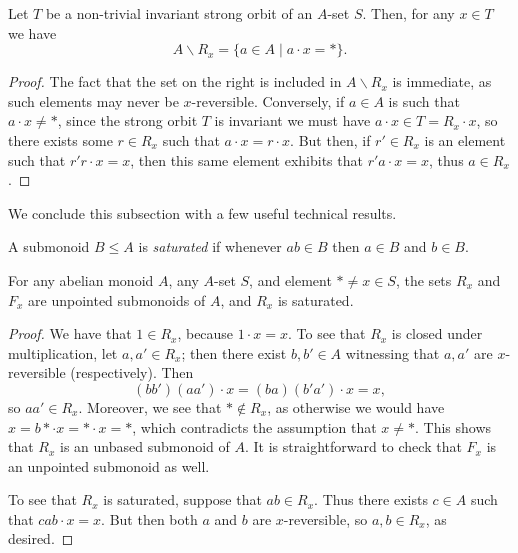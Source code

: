 \documentclass[11pt]{amsart}
\begin{document}
\begin{lemma}\label{A/Rx.acts.trivially}
    Let $T$ be a non-trivial invariant strong orbit of an $A$-set $S$. Then, for any $x\in T$ we have \[A \backslash R_x = \{a\in A \mid a\cdot x = *\}.\]
\end{lemma}
\begin{proof}
The fact that the set on the right is included in $A\backslash R_x$ is immediate, as such elements may never be $x$-reversible. Conversely, if $a\in A$ is such that $a\cdot x\neq *$, since the strong orbit $T$ is invariant we must have $a\cdot x\in T=R_x\cdot x$, so there exists some $r\in R_x$ such that $a\cdot x=r\cdot x$. But then, if $r'\in R_x$ is an element such that $r'r\cdot x=x$, then this same element exhibits that $r'a\cdot x=x$, thus $a\in R_x$. 
\end{proof}

We conclude this subsection with a few useful technical results. 

\begin{definition}
    A submonoid $B \leq A$ is \emph{saturated} if whenever $ab\in B$ then $a\in B$ and $b\in B$. 
\end{definition}

\begin{lemma} \label{lem:saturatedsub}
  For any abelian monoid $A$, any $A$-set  $S$, and element $*\neq x\in S$, the sets  $R_x$ and $F_x$ are unpointed submonoids of $A$, and $R_x$ is saturated.
\end{lemma}

\begin{proof}
   We have that $1\in R_x$, because $1 \cdot x = x$. To see that $R_x$ is closed under multiplication, let $a,a'\in R_x$; then there exist $b,b'\in A$ witnessing that $a,a'$ are $x$-reversible (respectively).  Then
    \[(bb')(aa')\cdot x = (ba)(b'a')\cdot x  = x,\]
    so $aa'\in R_x$. Moreover, we see that $*\notin R_x$, as otherwise we would have $x=b*\cdot x=*\cdot x=*$, which contradicts the assumption that $x\neq *$. This shows that $R_x$ is an unbased submonoid of $A$. It is straightforward to check that $F_x$ is an unpointed submonoid as well.

    To see that $R_x$ is saturated, suppose that $ab\in R_x$. Thus there exists $c\in A$ such that $cab\cdot x = x$.  But then both $a$ and $b$ are $x$-reversible, so $a,b\in R_x$, as desired.
\end{proof}
\end{document}
